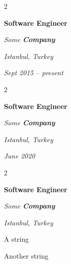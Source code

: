 \documentclass[10pt, letterpaper]{article}
\newenvironment{summary}{
    \begin{description}[
        topsep=0.10 cm,
        parsep=0.10 cm,
        partopsep=0pt,
        itemsep=0pt,
        leftmargin=0.4 cm + 10pt
    ]
}{
    \end{description}
} %
\newenvironment{twocolentry}[2][]{
    \onecolentry
    \def\secondColumn{#2}
    \setcolumnwidth{\fill, 4.5 cm}
    \begin{paracol}{2}
}{
    \switchcolumn \raggedleft \secondColumn
    \end{paracol}
    \endonecolentry
} %
\begin{document}
        \vspace{0.2 cm}

        \begin{twocolentry}{
        \textit{Istanbul, Turkey}    
            
        \textit{Sept 2015 – present}}
            \textbf{Software Engineer}
            
            \textit{Some \textbf{Company}}
        \end{twocolentry}


        \vspace{0.2 cm}

        \begin{twocolentry}{
        \textit{Istanbul, Turkey}    
            
        \textit{June 2020}}
            \textbf{Software Engineer}
            
            \textit{Some \textbf{Company}}
        \end{twocolentry}


        \vspace{0.2 cm}

        \begin{twocolentry}{
        \textit{Istanbul, Turkey}    
            
        }
            \textbf{Software Engineer}
            
            \textit{Some \textbf{Company}}
        \end{twocolentry}
            \begin{summary}
                \item A string
                \item Another string
            \end{summary}


        \vspace{0.2 cm}
\end{document}

